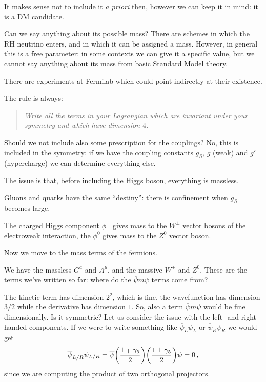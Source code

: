 \documentclass[main.tex]{subfiles}
\begin{document}
It makes sense not to include it \emph{a priori} then, however we can keep it in mind: it is a DM candidate.

Can we say anything about its possible mass? There are schemes in which the RH neutrino enters, and in which it can be assigned a mass. However, in general this is a free parameter: in some contexts we can give it a specific value, but we cannot say anything about its mass from basic Standard Model theory.

There are experiments at Fermilab which could point indirectly at their existence.

The rule is always: 
\begin{quote}
    \emph{Write all the terms in your Lagrangian which are invariant under your symmetry and which have dimension \( 4\).}
\end{quote}

Should we not include also some prescription for the couplings? 
No, this is included in the symmetry: if we have the coupling constants \(g_S\), \(g\) (weak) and \(g'\) (hypercharge) we can determine everything else.

The issue is that, before including the Higgs boson, everything is massless.

Gluons and quarks have the same ``destiny'': there is confinement when \(g_S\) becomes large.



The charged Higgs component \(\phi^{+}\) gives mass to the \(W^{\pm}\) vector bosons of the electroweak interaction, the \(\phi^{0}\) gives mass to the \(Z^{0}\) vector boson. 


Now we move to the mass terms of the fermions. 

We have the massless \(G^{a}\) and \(A^{\mu }\), and the massive \(W^{\pm}\) and \(Z^{0}\). These are the terms we've written so far: where do the \(\overline{\psi} m  \psi \) terms come from?



The kinetic term has dimension \(2^2\), which is fine, the wavefunction has dimension \(3/2\) while the derivative has dimension \(1\).
So, also a term \(\overline{\psi} m \psi \) would be fine dimensionally. Is it symmetric? 
Let us consider the issue with the left- and right-handed components. If we were to write something like \(\overline{\psi}_L \psi_L \) or \(\overline{\psi}_{R} \psi_{R}\) we would get 
%
\begin{align}
\overline{\psi}_{L/R} \psi_{L/R} = \overline{\psi} 
\qty(\frac{1 \mp \gamma_5 }{2}) 
\qty(\frac{1 \pm \gamma_5 }{2}) 
\psi 
= 0
\,,
\end{align}
%
since we are computing the product of two orthogonal projectors. 
\end{document}
